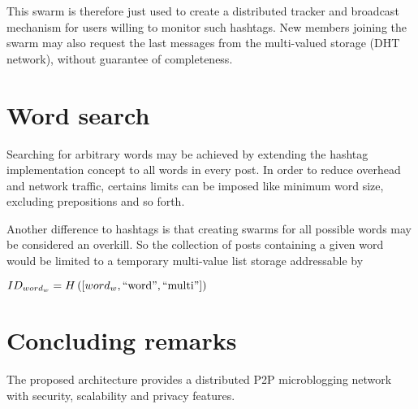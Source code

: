 \documentclass[a4paper,10pt]{article}
\begin{document}
This swarm is therefore just used to create a distributed tracker and broadcast mechanism for users willing to monitor such hashtags. New members joining the swarm may also request the last messages from the multi-valued storage (DHT network), without guarantee of completeness.


\section{Word search}

Searching for arbitrary words may be achieved by extending the hashtag implementation concept to all words in every post. In order to reduce overhead and network traffic, certains limits can be imposed like minimum word size, excluding prepositions and so forth. 

Another difference to hashtags is that creating swarms for all possible words may be considered an overkill. So the collection of posts containing a given word would be limited to a temporary multi-value list storage addressable by

$ID_{word_w} = H\left( [word_w, \textnormal{``word''},  \textnormal{``multi''}] \right)$

\section{Concluding remarks}
\label{sec:remarks}

The proposed architecture provides a distributed P2P microblogging network with security, scalability and privacy features.
\end{document}
